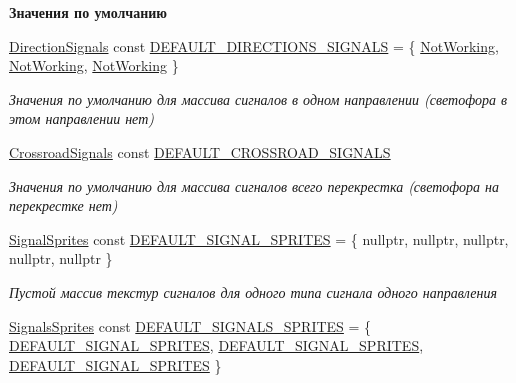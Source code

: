 \begin{Indent}\textbf{ Значения по умолчанию}\par
\begin{DoxyCompactItemize}
\item 
\mbox{\label{namespacertm_ab5bb2d119539a5a60349a21fec8821f6}} 
\hyperlink{namespacertm_a681634e130c2137fe63a658b0e0a5e46}{Direction\+Signals} const \hyperlink{namespacertm_ab5bb2d119539a5a60349a21fec8821f6}{D\+E\+F\+A\+U\+L\+T\+\_\+\+D\+I\+R\+E\+C\+T\+I\+O\+N\+S\+\_\+\+S\+I\+G\+N\+A\+LS} = \{ \hyperlink{namespacertm_aadb7300c15d57429546fb0b7f8ee0ee6ad63ea1c40cb745fd50a2efad23ccbd1f}{Not\+Working}, \hyperlink{namespacertm_aadb7300c15d57429546fb0b7f8ee0ee6ad63ea1c40cb745fd50a2efad23ccbd1f}{Not\+Working}, \hyperlink{namespacertm_aadb7300c15d57429546fb0b7f8ee0ee6ad63ea1c40cb745fd50a2efad23ccbd1f}{Not\+Working} \}
\begin{DoxyCompactList}\small\item\em Значения по умолчанию для массива сигналов в одном направлении (светофора в этом направлении нет) \end{DoxyCompactList}\item 
\hyperlink{namespacertm_afa6df86cef8e2ebcc053ad994e440354}{Crossroad\+Signals} const \hyperlink{namespacertm_ac3892e23135322d9026ef00af1a76344}{D\+E\+F\+A\+U\+L\+T\+\_\+\+C\+R\+O\+S\+S\+R\+O\+A\+D\+\_\+\+S\+I\+G\+N\+A\+LS}
\begin{DoxyCompactList}\small\item\em Значения по умолчанию для массива сигналов всего перекрестка (светофора на перекрестке нет) \end{DoxyCompactList}\item 
\mbox{\label{namespacertm_a47d97d0bbd767b6cb6b30b221f8d8a51}} 
\hyperlink{namespacertm_ab6c6acbd1378bfe5755d77179a7131ff}{Signal\+Sprites} const \hyperlink{namespacertm_a47d97d0bbd767b6cb6b30b221f8d8a51}{D\+E\+F\+A\+U\+L\+T\+\_\+\+S\+I\+G\+N\+A\+L\+\_\+\+S\+P\+R\+I\+T\+ES} = \{ nullptr, nullptr, nullptr, nullptr, nullptr \}
\begin{DoxyCompactList}\small\item\em Пустой массив текстур сигналов для одного типа сигнала одного направления \end{DoxyCompactList}\item 
\mbox{\label{namespacertm_a83e72513cb0cd2f63cff211387bdbb31}} 
\hyperlink{namespacertm_a260109b3376dc38095724ee80ed72d8e}{Signals\+Sprites} const \hyperlink{namespacertm_a83e72513cb0cd2f63cff211387bdbb31}{D\+E\+F\+A\+U\+L\+T\+\_\+\+S\+I\+G\+N\+A\+L\+S\+\_\+\+S\+P\+R\+I\+T\+ES} = \{ \hyperlink{namespacertm_a47d97d0bbd767b6cb6b30b221f8d8a51}{D\+E\+F\+A\+U\+L\+T\+\_\+\+S\+I\+G\+N\+A\+L\+\_\+\+S\+P\+R\+I\+T\+ES}, \hyperlink{namespacertm_a47d97d0bbd767b6cb6b30b221f8d8a51}{D\+E\+F\+A\+U\+L\+T\+\_\+\+S\+I\+G\+N\+A\+L\+\_\+\+S\+P\+R\+I\+T\+ES}, \hyperlink{namespacertm_a47d97d0bbd767b6cb6b30b221f8d8a51}{D\+E\+F\+A\+U\+L\+T\+\_\+\+S\+I\+G\+N\+A\+L\+\_\+\+S\+P\+R\+I\+T\+ES} \}

\end{DoxyCompactItemize}
\end{Indent}
